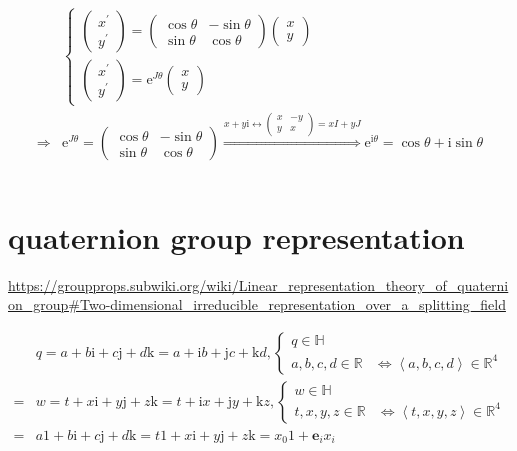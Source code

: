 \documentclass[
]{book}
\theoremstyle{definition}
\theoremstyle{definition}
\theoremstyle{definition}
\theoremstyle{definition}
\theoremstyle{remark}
\begin{document}
\[
\begin{aligned}
 & \begin{cases}
\begin{pmatrix}x^{\prime}\\
y^{\prime}
\end{pmatrix}=\begin{pmatrix}\cos\theta & -\sin\theta\\
\sin\theta & \cos\theta
\end{pmatrix}\begin{pmatrix}x\\
y
\end{pmatrix}\\
\begin{pmatrix}x^{\prime}\\
y^{\prime}
\end{pmatrix}=\mathrm{e}^{J\theta}\begin{pmatrix}x\\
y
\end{pmatrix}
\end{cases}\\
\Rightarrow & \mathrm{e}^{J\theta}=\begin{pmatrix}\cos\theta & -\sin\theta\\
\sin\theta & \cos\theta
\end{pmatrix}\overset{x+y\mathrm{i}\leftrightarrow\begin{pmatrix}x & -y\\
y & x
\end{pmatrix}=xI+yJ}{\Rightarrow}\mathrm{e}^{\mathrm{i}\theta}=\cos\theta+\mathrm{i}\sin\theta
\end{aligned}
\]

\[
\ \tag*{$\Box$}
\]

\section{quaternion group representation}\label{quaternion-group-representation}

\url{https://groupprops.subwiki.org/wiki/Linear_representation_theory_of_quaternion_group\#Two-dimensional_irreducible_representation_over_a_splitting_field}

\[
\begin{aligned}
 & q=a+b\mathrm{i}+c\mathrm{j}+d\mathrm{k}=a+\mathrm{i}b+\mathrm{j}c+\mathrm{k}d,\begin{cases}
q\in\mathbb{H}\\
a,b,c,d\in\mathbb{R} & \Leftrightarrow\left\langle a,b,c,d\right\rangle \in\mathbb{R}^{4}
\end{cases}\\
= & w=t+x\mathrm{i}+y\mathrm{j}+z\mathrm{k}=t+\mathrm{i}x+\mathrm{j}y+\mathrm{k}z,\begin{cases}
w\in\mathbb{H}\\
t,x,y,z\in\mathbb{R} & \Leftrightarrow\left\langle t,x,y,z\right\rangle \in\mathbb{R}^{4}
\end{cases}\\
= & a1+b\mathrm{i}+c\mathrm{j}+d\mathrm{k}=t1+x\mathrm{i}+y\mathrm{j}+z\mathrm{k}=x_{{\scriptscriptstyle 0}}1+\boldsymbol{e}_{{\scriptscriptstyle i}}x_{{\scriptscriptstyle i}}
\end{aligned}
\]
\end{document}
